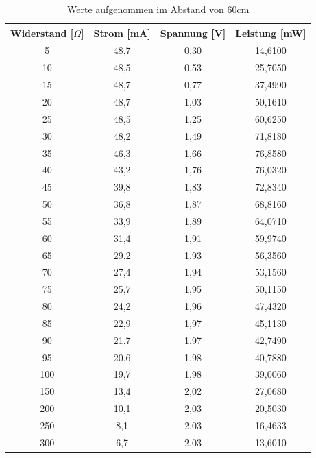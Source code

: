  \renewcommand{\arraystretch}{0,75}
 \begin{table}[H]
\begin{tabular}{|c|c|c|c|}
\hline 
Widerstand [$\Omega$]	&Strom [mA]	&Spannung [V]	&Leistung [mW]\\	
\hline
5	&48,7	&0,30	&14,6100\\
10	&48,5	&0,53	&25,7050\\
15	&48,7	&0,77	&37,4990\\
20	&48,7	&1,03	&50,1610\\
25	&48,5	&1,25	&60,6250\\
30	&48,2	&1,49	&71,8180\\
35	&46,3	&1,66	&76,8580\\
40	&43,2	&1,76	&76,0320\\
45	&39,8	&1,83	&72,8340\\
50	&36,8	&1,87	&68,8160\\
55	&33,9	&1,89	&64,0710\\
60	&31,4	&1,91	&59,9740\\
65	&29,2	&1,93	&56,3560\\
70	&27,4	&1,94	&53,1560\\
75	&25,7	&1,95	&50,1150\\
80	&24,2	&1,96	&47,4320\\
85	&22,9	&1,97	&45,1130\\
90	&21,7	&1,97	&42,7490\\
95	&20,6	&1,98	&40,7880\\
100	&19,7	&1,98	&39,0060\\
150	&13,4	&2,02	&27,0680\\
200	&10,1	&2,03	&20,5030\\
250	&8,1	&2,03	&16,4633\\
300	&6,7	&2,03	&13,6010\\
\hline 
\end{tabular}
\caption{Werte aufgenommen im Abstand von 60cm} 
\end{table}

